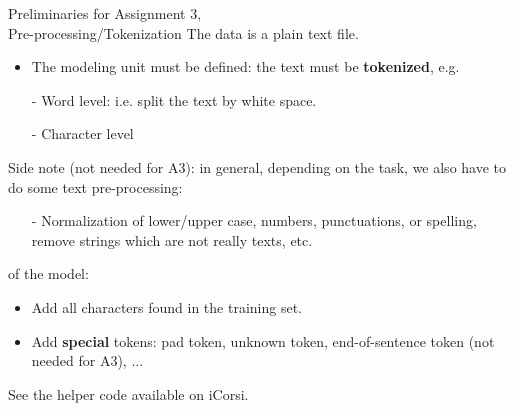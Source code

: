 \begin{frame}{Preliminaries for Assignment 3,\\
Pre-processing/Tokenization}
The data is a plain text file.
\begin{itemize}
\item The modeling unit must be defined: the text must be \textbf{tokenized}, e.g.
\item[-] Word level: i.e. split the text by white space.
\item[-] Character level
\end{itemize}
\vsp
Side note (not needed for A3): in general, depending on the task,
we also have to do some text pre-processing:
\begin{itemize}
\item[-] Normalization of lower/upper case, numbers, punctuations, or spelling, remove strings which are not really texts, etc.
\end{itemize}
 of the model:
\begin{itemize}
\item Add all characters found in the training set.
\item Add \textbf{special} tokens: pad token, unknown token, end-of-sentence token (not needed for A3), ...
\end{itemize}
See the helper code available on iCorsi.
\end{frame}
%
